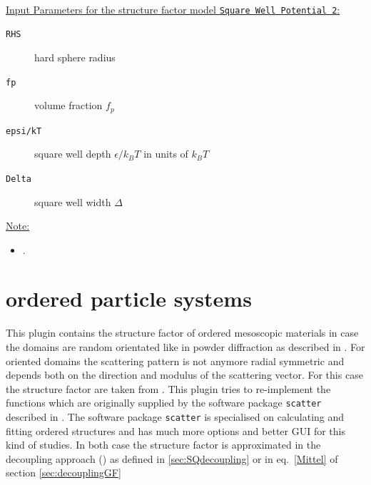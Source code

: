 ~\\
\uline{Input Parameters for the structure factor model \texttt{Square Well Potential 2}:}
\begin{description}
\item[\texttt{RHS}] hard sphere radius
\item[\texttt{fp}] volume fraction $f_p$
\item[\texttt{epsi/kT}]square well depth $\epsilon/k_BT$ in units of $k_BT$
\item[\texttt{Delta}] square well width $\Delta$
\end{description}

\noindent\uline{Note:}
\begin{itemize}
\item .
\end{itemize}



\clearpage
\section{ordered particle systems} \hspace{1pt}
\label{sec:ops}
This plugin contains the structure factor of ordered mesoscopic materials in case the domains are random orientated like in powder diffraction as described in \cite{Forster2005}. For oriented domains the scattering pattern is not anymore radial symmetric and depends both on the direction and modulus of the scattering vector. For this case the structure factor are taken from  \cite{Forster2011}. This plugin tries to re-implement the functions which are originally supplied by the software package \texttt{scatter} described in \cite{Forster2010}. The software package \texttt{scatter} is specialised on calculating and fitting ordered structures and has much more options and better GUI for this kind of studies. In both case the structure factor is approximated in the decoupling approach (\cite{Kotlarchyk1983}) as defined in \ref{sec:SQdecoupling} or in eq.\ \ref{Mittel} of section \ref{sec:decouplingGF}

